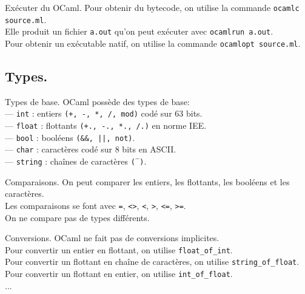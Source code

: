 \documentclass[french, 11pt]{article}
\begin{document}
\begin{defi}{Exécuter du OCaml.}{}
    Pour obtenir du bytecode, on utilise la commande \texttt{ocamlc source.ml}.\\
    Elle produit un fichier \texttt{a.out} qu'on peut exécuter avec \texttt{ocamlrun a.out}.\\
    Pour obtenir un exécutable natif, on utilise la commande \texttt{ocamlopt source.ml}.
\end{defi}

\subsection{Types.}

\begin{defi}{Types de base.}{}
    OCaml possède des types de base:\\
    --- \texttt{int} : entiers \texttt{(+, -, *, /, mod)} codé sur 63 bits.\\
    --- \texttt{float} : flottants \texttt{(+., -., *., /.)} en norme IEE.\\
    --- \texttt{bool} : booléens \texttt{(\&\&, ||, not)}.\\
    --- \texttt{char} : caractères codé sur 8 bits en ASCII.\\
    --- \texttt{string} : chaînes de caractères \texttt{($\hat{\phantom{a}}$)}.
\end{defi}

\begin{defi}{Comparaisons.}{}
    On peut comparer les entiers, les flottants, les booléens et les caractères.\\
    Les comparaisons se font avec \texttt{=}, \texttt{<>}, \texttt{<}, \texttt{>}, \texttt{<=}, \texttt{>=}.\\
    On ne compare pas de types différents.
\end{defi}

\begin{defi}{Conversions.}{}
    OCaml ne fait pas de conversions implicites.\\
    Pour convertir un entier en flottant, on utilise \texttt{float\_of\_int}.\\
    Pour convertir un flottant en chaîne de caractères, on utilise \texttt{string\_of\_float}.\\
    Pour convertir un flottant en entier, on utilise \texttt{int\_of\_float}.\\
    ...
\end{defi}
\end{document}
